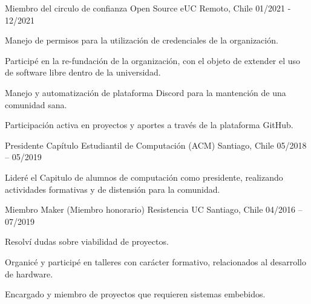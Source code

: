 

\begin{cventries}

  \cventry
    {Miembro del circulo de confianza} %
    {Open Source eUC} %
    {Remoto, Chile} %
    {01/2021 - 12/2021} %
    {
      \begin{cvitems} %
        \item {Manejo de permisos para la utilización de credenciales de la organización.}
        \item {Participé en la re-fundación de la organización, con el objeto de extender el uso de software libre dentro de la universidad.}
        \item {Manejo y automatización de plataforma Discord para la mantención de una comunidad sana.}
        \item {Participación activa en proyectos y aportes a través de la plataforma GitHub.}
      \end{cvitems}
    }

  \cventry
    {Presidente} %
    {Capítulo Estudiantil de Computación (ACM)} %
    {Santiago, Chile} %
    {05/2018 – 05/2019} %
    {
      \begin{cvitems} %
        \item {Lideré el Capitulo de alumnos de computación como presidente, realizando actividades formativas y de distensión para la comunidad.}
      \end{cvitems}
    }


  \cventry
    {Miembro Maker (Miembro honorario)} %
    {Resistencia UC} %
    {Santiago, Chile} %
    {04/2016 – 07/2019} %
    {
      \begin{cvitems} %
        \item {Resolví dudas sobre viabilidad de proyectos.}
        \item {Organicé y participé en talleres con carácter formativo, relacionados al desarrollo de hardware.}
        \item {Encargado y miembro de proyectos que requieren sistemas embebidos.}
      \end{cvitems}
    }


\end{cventries}
